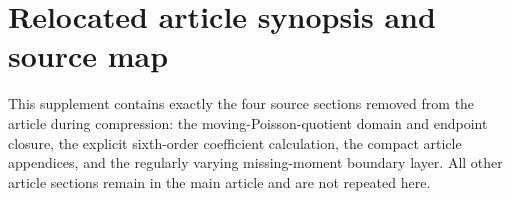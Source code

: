 





\section*{Relocated article synopsis and source map}

This supplement contains exactly the four source sections removed from the
article during compression: the moving-Poisson-quotient domain and endpoint
closure, the explicit sixth-order coefficient calculation, the compact
article appendices, and the regularly varying missing-moment boundary layer.
All other article sections remain in the main article and are not repeated
here.
